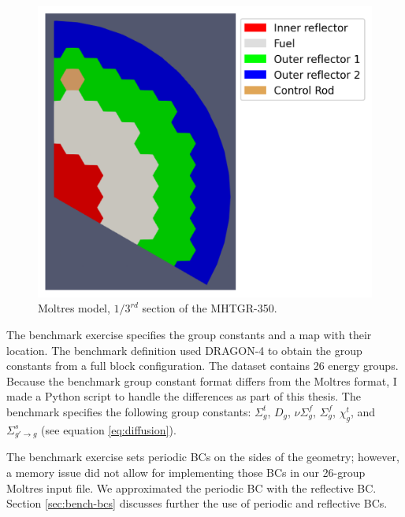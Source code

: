 \begin{figure}[htbp!]
	\centering
	\includegraphics[width=0.55\linewidth]{figures-neutronics/oecd-fullcore-legend}
	\hfill
	\caption{Moltres model, $1/3^{rd}$ section of the MHTGR-350.}
	\label{fig:bench-mesh}
\end{figure}


The benchmark exercise specifies the group constants and a map with their location.
The benchmark definition used DRAGON-4 \cite{marleau_user_2016} to obtain the group constants from a full block configuration.
The dataset contains 26 energy groups.
Because the benchmark group constant format differs from the Moltres format, I made a Python script to handle the differences as part of this thesis.
The benchmark specifies the following group constants: $\Sigma_g^t$, $D_g$, $\nu\Sigma_g^f$, $\Sigma_g^f$, $\chi_g^t$, and $\Sigma_{g'\rightarrow g}^s$ (see equation \ref{eq:diffusion}).

The benchmark exercise sets periodic \glspl{BC} on the sides of the geometry; however, a memory issue did not allow for implementing those BCs in our 26-group Moltres input file.
We approximated the periodic BC with the reflective BC.
Section \ref{sec:bench-bcs} discusses further the use of periodic and reflective BCs.

